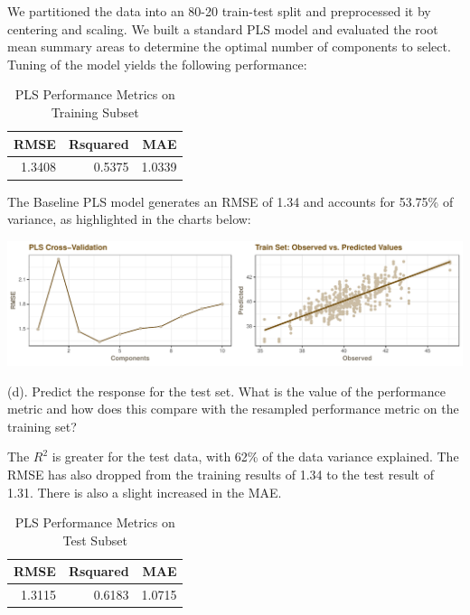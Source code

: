 \documentclass[]{report}
\begin{document}
We partitioned the data into an 80-20 train-test split and preprocessed
it by centering and scaling. We built a standard PLS model and evaluated
the root mean summary areas to determine the optimal number of
components to select. Tuning of the model yields the following
performance:

\begin{table}[H]

\caption{\label{tab:kj-6.3c}PLS Performance Metrics on Training Subset}
\centering
\fontsize{8}{10}\selectfont
\begin{tabular}[t]{rrr}
\toprule
\textbf{RMSE} & \textbf{Rsquared} & \textbf{MAE}\\
\midrule
\rowcolor{gray!6}  1.3408 & 0.5375 & 1.0339\\
\bottomrule
\end{tabular}
\end{table}

The Baseline PLS model generates an RMSE of 1.34 and accounts for
53.75\% of variance, as highlighted in the charts below:

\includegraphics{Homework-Two2_files/figure-latex/kj-6.3c2-1.pdf}

\begin{subquestion}{(d).} Predict the response for the test set. What is the value of the performance metric and how does this compare with the resampled performance metric on the training set? 
\end{subquestion}

The \(R^2\) is greater for the test data, with 62\% of the data variance
explained. The RMSE has also dropped from the training results of 1.34
to the test result of 1.31. There is also a slight increased in the MAE.

\begin{table}[H]

\caption{\label{tab:kj-6.3d-1}PLS Performance Metrics on Test Subset}
\centering
\fontsize{8}{10}\selectfont
\begin{tabular}[t]{rrr}
\toprule
\textbf{RMSE} & \textbf{Rsquared} & \textbf{MAE}\\
\midrule
\rowcolor{gray!6}  1.3115 & 0.6183 & 1.0715\\
\bottomrule
\end{tabular}
\end{table}
\end{document}
